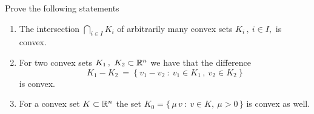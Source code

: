 \documentclass{ExerciseSheet}
\begin{document}
\vskip 0.5cm
\begin{exo}
Prove the following statements 
\begin{enumerate} 
 \item The intersection $\displaystyle\bigcap_{i\in I} K_i$ of arbitrarily many convex sets $K_i\,,\ i\in I,$ is convex. %
  \item For two convex sets $K_1\,,\ K_2\subset\R^n$ we have that the difference
  $$
K_1-K_2\ =\ \{\ v_1-v_2 \ : \ v_1\in K_1\,,\ v_2\in K_2 \ \}
$$
is convex.
\item For a convex set $K\subset\mathbb{R}^n$ the set
$K_0=\{\,\mu\,v \ : \ v\in K,\ \mu>0\,\}$ is convex as well.
\end{enumerate}
	
\end{exo}
\end{document}
